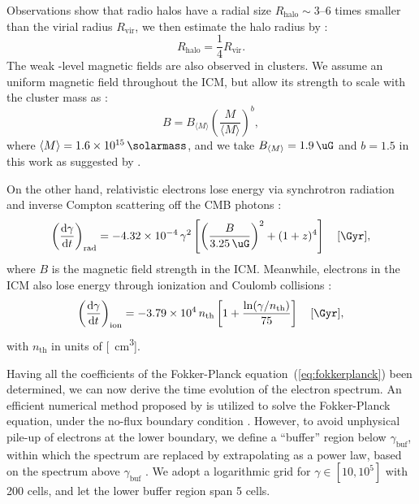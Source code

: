 \documentclass[modern]{aastex61}
\newcommand{\R}[1]{\mathrm{#1}}
\newcommand{\D}[1]{\R{d} #1}
\newcommand{\diff}[2]{\frac{\D{#1}}{\D{#2}}}
\begin{document}
Observations show that radio halos have a radial size
$R_{\R{halo}} \sim \numrange{3}{6}$ times smaller than the virial radius
$R_{\R{vir}}$, we then estimate the halo radius by
\citep{cassano2007,zandanel2014}:
\begin{equation}
  \label{eq:rhalo-rvir}
  R_{\R{halo}} = \frac{1}{4} R_{\R{vir}}.
\end{equation}
The weak \si{\uG}-level magnetic fields are also observed in clusters.
We assume an uniform magnetic field throughout the ICM,
but allow its strength to scale with the cluster mass as \citep{cassano2012}:
\begin{equation}
  \label{eq:magfield-mass}
  B = B_{\langle{M}\rangle} \left( \frac{M}{\langle{M}\rangle} \right)^b,
\end{equation}
where $\langle {M} \rangle = \SI{1.6e15}{\solarmass}$, and we take
$B_{\langle {M} \rangle} = \SI{1.9}{\uG}$ and $b = 1.5$ in this work
as suggested by \citet{cassano2006}.

On the other hand,
relativistic electrons lose energy via synchrotron radiation
and inverse Compton scattering off the CMB photons \citep{sarazin1999}:
\begin{equation}
  \label{eq:eloss-rad}
  \left( \diff{\gamma}{t} \right)_{\R{rad}} =
  \num{-4.32e-4} \,\gamma^2
  \left[ \left( \frac{B}{\SI{3.25}{\uG}} \right)^2 +
  (1+z)^4 \right] \quad [\si{\per\Gyr}],
\end{equation}
where $B$ is the magnetic field strength in the ICM.
Meanwhile, electrons in the ICM also lose energy through
ionization and Coulomb collisions \citep{sarazin1999}:
\begin{equation}
  \label{eq:eloss-ion}
  \left( \diff{\gamma}{t} \right)_{\R{ion}} =
  \num{-3.79e4} \,n_{\R{th}} \left[ 1 +
    \frac{\ln(\gamma/n_{\R{th}})}{75} \right] \quad [\si{\per\Gyr}],
\end{equation}
with $n_{\R{th}}$ in units of [\si{\per\cm\cubed}].

Having all the coefficients of the Fokker-Planck
equation~(\ref{eq:fokkerplanck}) been determined, we can now derive
the time evolution of the electron spectrum.
An efficient numerical method proposed by \citet{chang1970} is
utilized to solve the Fokker-Planck equation, under the no-flux boundary
condition \citep{park1996}.
However, to avoid unphysical pile-up of electrons at the lower boundary,
we define a ``buffer'' region below $\gamma_{\R{buf}}$, within which
the spectrum are replaced by extrapolating as a power law, based on
the spectrum above $\gamma_{\R{buf}}$ \citep{donnert2014}.
We adopt a logarithmic grid for $\gamma \in [10, 10^5]$ with 200 cells,
and let the lower buffer region span 5 cells.
\end{document}
